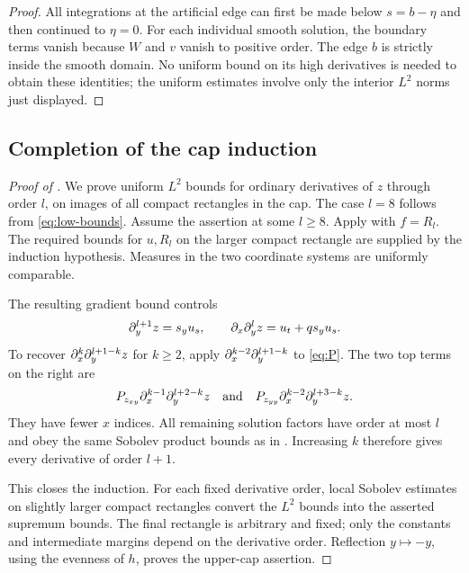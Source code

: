 \begin{proof}
All integrations at the artificial edge can first be made below
\(s=b-\eta\) and then continued to \(\eta=0\).
For each individual smooth solution, the boundary terms vanish
because \(W\) and \(v\) vanish to positive order. The edge \(b\)
is strictly inside the smooth domain. No uniform bound on its
high derivatives is needed to obtain these identities; the uniform
estimates involve only the interior \(L^2\) norms just displayed.
\end{proof}

\subsection{Completion of the cap induction}

\begin{proof}[Proof of ]
We prove uniform \(L^2\) bounds for ordinary derivatives of \(z\)
through order \(l\), on images of all compact rectangles in the
cap. The case \(l=8\) follows from \eqref{eq:low-bounds}.
Assume the assertion at some \(l\ge8\). Apply
 with \(f=R_l\).
The required bounds for \(u,R_l\) on the larger compact rectangle
are supplied by the induction hypothesis. Measures in the two
coordinate systems are uniformly comparable.

The resulting gradient bound controls
\[
\partial_y^{l+1}z=s_yu_s,\qquad
\partial_x\partial_y^lz=u_t+q s_yu_s.
\]
To recover \(\partial_x^k\partial_y^{l+1-k}z\) for \(k\ge2\), apply
\(\partial_x^{k-2}\partial_y^{l+1-k}\) to \eqref{eq:P}.
The two top terms on the right are
\[
P_{z_{xy}}\partial_x^{k-1}\partial_y^{l+2-k}z
\quad\text{and}\quad
P_{z_{yy}}\partial_x^{k-2}\partial_y^{l+3-k}z.
\]
They have fewer \(x\) indices. All remaining solution factors
have order at most \(l\) and obey the same Sobolev product bounds
as in . Increasing \(k\) therefore gives
every derivative of order \(l+1\).

This closes the induction. For each fixed derivative order, local
Sobolev estimates on slightly larger compact rectangles convert
the \(L^2\) bounds into the asserted supremum bounds. The final
rectangle is arbitrary and fixed; only the constants and intermediate
margins depend on the derivative order.
Reflection \(y\mapsto-y\), using the evenness of \(h\), proves
the upper-cap assertion.
\end{proof}
